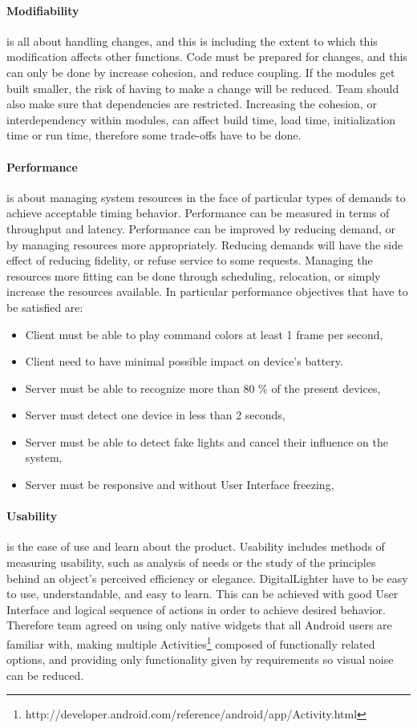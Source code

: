 \paragraph{Modifiability}
is all about handling changes, and this is including the extent to which this modification affects other functions. 
Code must be prepared for changes, and this can only be done by increase cohesion, and reduce coupling. 
If the modules get built smaller, the risk of having to make a change will be reduced. 
Team should also make sure that dependencies are restricted. 
Increasing the cohesion, or interdependency within modules, can affect build time, load time, initialization time or run time, therefore some trade-offs have to be done.

\paragraph{Performance}
is about managing system resources in the face of particular types of demands to achieve acceptable timing behavior.
Performance can be measured in terms of throughput and latency. 
Performance can be improved by reducing demand, or by managing resources more appropriately. 
Reducing demands will have the side effect of reducing fidelity, or refuse service to some requests. 
Managing the resources more fitting can be done through scheduling, relocation, or simply increase the resources available.
In particular performance objectives that have to be satisfied are:
\begin{itemize}
\item Client must be able to play command colors at least 1 frame per second,
\item Client need to have minimal possible impact on device's battery. 
\item Server must be able to recognize more than 80 \% of the present devices,
\item Server must detect one device in less than 2 seconds,
\item Server must be able to detect fake lights and cancel their influence on the system,
\item Server must be responsive and without User Interface freezing,
\end{itemize}

\paragraph{Usability}
is the ease of use and learn about the product.
Usability includes methods of measuring usability, such as analysis of needs or the study of the principles behind an object's perceived efficiency or elegance. DigitalLighter have to be easy to use, understandable, and easy to learn. This can be achieved with good User Interface and logical sequence of actions in order to achieve desired behavior. Therefore team agreed on using only native widgets that all Android users are familiar with, making multiple Activities\footnote{http://developer.android.com/reference/android/app/Activity.html} composed of functionally related options, and providing only functionality given by requirements so visual noise can be reduced. 

